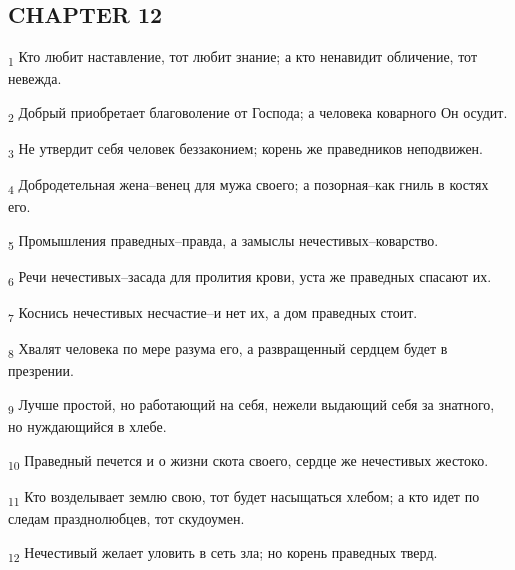 \subsection{CHAPTER 12}
\begin{tcolorbox}
\textsubscript{1} Кто любит наставление, тот любит знание; а кто ненавидит обличение, тот невежда.
\end{tcolorbox}
\begin{tcolorbox}
\textsubscript{2} Добрый приобретает благоволение от Господа; а человека коварного Он осудит.
\end{tcolorbox}
\begin{tcolorbox}
\textsubscript{3} Не утвердит себя человек беззаконием; корень же праведников неподвижен.
\end{tcolorbox}
\begin{tcolorbox}
\textsubscript{4} Добродетельная жена--венец для мужа своего; а позорная--как гниль в костях его.
\end{tcolorbox}
\begin{tcolorbox}
\textsubscript{5} Промышления праведных--правда, а замыслы нечестивых--коварство.
\end{tcolorbox}
\begin{tcolorbox}
\textsubscript{6} Речи нечестивых--засада для пролития крови, уста же праведных спасают их.
\end{tcolorbox}
\begin{tcolorbox}
\textsubscript{7} Коснись нечестивых несчастие--и нет их, а дом праведных стоит.
\end{tcolorbox}
\begin{tcolorbox}
\textsubscript{8} Хвалят человека по мере разума его, а развращенный сердцем будет в презрении.
\end{tcolorbox}
\begin{tcolorbox}
\textsubscript{9} Лучше простой, но работающий на себя, нежели выдающий себя за знатного, но нуждающийся в хлебе.
\end{tcolorbox}
\begin{tcolorbox}
\textsubscript{10} Праведный печется и о жизни скота своего, сердце же нечестивых жестоко.
\end{tcolorbox}
\begin{tcolorbox}
\textsubscript{11} Кто возделывает землю свою, тот будет насыщаться хлебом; а кто идет по следам празднолюбцев, тот скудоумен.
\end{tcolorbox}
\begin{tcolorbox}
\textsubscript{12} Нечестивый желает уловить в сеть зла; но корень праведных тверд.
\end{tcolorbox}
